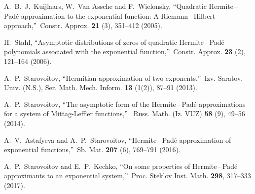 \documentclass[
11pt,%
tightenlines,%
twoside,%
onecolumn,%
nofloats,%
nobibnotes,%
nofootinbib,%
superscriptaddress,%
noshowpacs,%
centertags]%
{revtex4}
\begin{document}
\begin{thebibliography}{99}
A.~B.~J.~Kuijlaars, W.~Van Assche and F.~Wielonsky, \textquotedblleft Quadratic
Hermite\,--\,Pad\'e approximation to the exponential function: A
Riemann\,--\,Hilbert approach,\textquotedblright~Constr. Approx. \textbf{21} (3),
351--412 (2005).

H.~Stahl, \textquotedblleft Asymptotic distributions of zeros of quadratic
Hermite\,--\,Pad\'e polynomials associated with the exponential
function,\textquotedblright~Constr. Approx. \textbf{23} (2), 121--164 (2006).

A.~P.~Starovoitov, \textquotedblleft Hermitian approximation of two
exponents,\textquotedblright~Izv. Saratov. Univ. (N.S.), Ser. Math. Mech.
Inform. \textbf{13} (1(2)), 87--91 (2013).

A.~P.~Starovoitov, \textquotedblleft The asymptotic form of the Hermite\,--\,Pad\'e
approximations for a system of Mittag-Leffler functions,\textquotedblright~
Russ. Math. (Iz. VUZ) \textbf{58} (9), 49--56 (2014).

A.~V.~Astafyeva and A.~P.~Starovoitov, \textquotedblleft Hermite\,--\,Pad\'e approximation
of exponential functions,\textquotedblright~Sb. Mat. \textbf{207} (6), 769--791 (2016).

A.~P.~Starovoitov and E.~P.~Kechko, \textquotedblleft On some properties of
Hermite\,--\,Pad\'e approximants to an exponential system,\textquotedblright~Proc. Steklov Inst. Math. \textbf{298}, 317--333 (2017).

\end{thebibliography}
\end{document}
